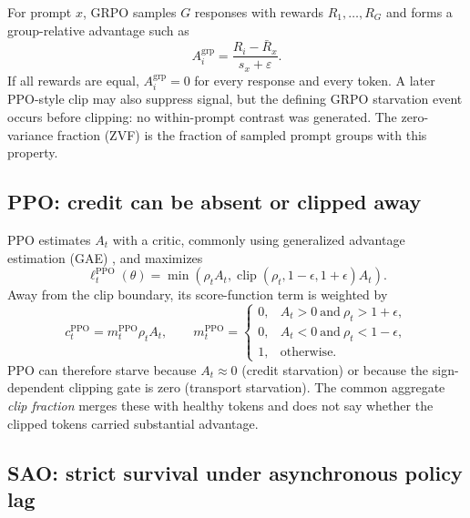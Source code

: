 \documentclass{article}
\begin{document}
For prompt $x$, GRPO samples $G$ responses with rewards $R_1,\ldots,R_G$ and
forms a group-relative advantage such as
\begin{equation}
  A_i^{\mathrm{grp}}=
  \frac{R_i-\bar R_x}{s_x+\varepsilon}.
  \label{eq:grpo-adv}
\end{equation}
If all rewards are equal, $A_i^{\mathrm{grp}}=0$ for every response and every
token.  A later PPO-style clip may also suppress signal, but the defining
GRPO starvation event occurs before clipping: no within-prompt contrast was
generated.  The zero-variance fraction (ZVF) is the fraction of sampled prompt
groups with this property.

\subsection{PPO: credit can be absent or clipped away}

PPO estimates $A_t$ with a critic, commonly using generalized advantage
estimation (GAE) \citep{schulman2016gae}, and maximizes
\begin{equation}
  \ell_t^{\mathrm{PPO}}(\theta)=
  \min\!\left(\rho_t A_t,
    \operatorname{clip}(\rho_t,1-\epsilon,1+\epsilon)A_t\right).
  \label{eq:ppo}
\end{equation}
Away from the clip boundary, its score-function term is weighted by
\begin{equation}
  c_t^{\mathrm{PPO}}=m_t^{\mathrm{PPO}}\rho_t A_t,
  \qquad
  m_t^{\mathrm{PPO}}=
  \begin{cases}
    0, & A_t>0\ \text{and}\ \rho_t>1+\epsilon,\\
    0, & A_t<0\ \text{and}\ \rho_t<1-\epsilon,\\
    1, & \text{otherwise.}
  \end{cases}
  \label{eq:ppo-gate}
\end{equation}
PPO can therefore starve because $A_t\approx0$ (credit starvation) or because
the sign-dependent clipping gate is zero (transport starvation).  The common
aggregate \emph{clip fraction} merges these with healthy tokens and does not
say whether the clipped tokens carried substantial advantage.

\subsection{SAO: strict survival under asynchronous policy lag}
\end{document}
